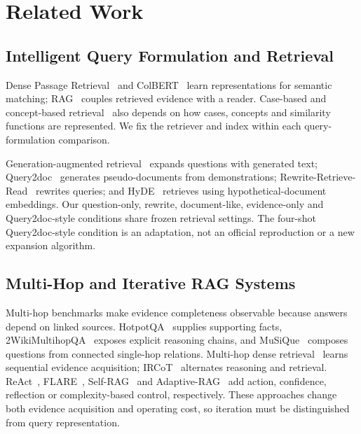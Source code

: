 \section{Related Work}
\label{sec:related_work}

\subsection{Intelligent Query Formulation and Retrieval}
\label{sec:rw_query_retrieval}

Dense Passage Retrieval~\cite{karpukhin2020dpr} and ColBERT~\cite{khattab2020colbert} learn representations for semantic matching; RAG~\cite{lewis2020rag} couples retrieved evidence with a reader. Case-based and concept-based retrieval~\cite{nasar2024retrieval} also depends on how cases, concepts and similarity functions are represented. We fix the retriever and index within each query-formulation comparison.

Generation-augmented retrieval~\cite{mao2020gar} expands questions with generated text; Query2doc~\cite{wang2023query2doc} generates pseudo-documents from demonstrations; Rewrite-Retrieve-Read~\cite{ma2023rewrite} rewrites queries; and HyDE~\cite{gao2022hyde} retrieves using hypothetical-document embeddings. Our question-only, rewrite, document-like, evidence-only and Query2doc-style conditions share frozen retrieval settings. The four-shot Query2doc-style condition is an adaptation, not an official reproduction or a new expansion algorithm.

\subsection{Multi-Hop and Iterative RAG Systems}
\label{sec:rw_multihop_iterative}

Multi-hop benchmarks make evidence completeness observable because answers depend on linked sources. HotpotQA~\cite{yang2018hotpotqa} supplies supporting facts, 2WikiMultihopQA~\cite{ho2020twowiki} exposes explicit reasoning chains, and MuSiQue~\cite{trivedi2021musique} composes questions from connected single-hop relations. Multi-hop dense retrieval~\cite{xiong2021multihopdense} learns sequential evidence acquisition; IRCoT~\cite{trivedi2022ircot} alternates reasoning and retrieval. ReAct~\cite{yao2022react}, FLARE~\cite{jiang2023flare}, Self-RAG~\cite{asai2023selfrag} and Adaptive-RAG~\cite{jeong2024adaptiverag} add action, confidence, reflection or complexity-based control, respectively. These approaches change both evidence acquisition and operating cost, so iteration must be distinguished from query representation.

